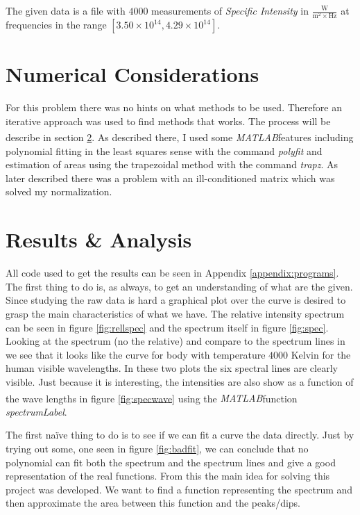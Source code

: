 \documentclass[10pt, a4paper]{article}
\newcommand{\matlab}{\small{\emph{MATLAB\textsuperscript{\textregistered}}}}
\begin{document}
The given data is a file with $4000$ measurements of \emph{Specific Intensity} in $\frac{\mathrm{W}}{\mathrm{m}^2\times \mathrm{Hz}}$ at frequencies in the range $[3.50\times10^{14}, 4.29\times10^{14}]$.

\section{Numerical Considerations}
For this problem there was no hints on what methods to be used. Therefore an iterative approach was used to find methods that works. The process will be describe in section \ref{sec:result}. As described there, I used some \matlab features including polynomial fitting in the least squares sense with the command \emph{polyfit} and estimation of areas using the trapezoidal method with the command \emph{trapz}. As later described there was a problem with an ill-conditioned matrix which was solved my normalization.

\section{Results \& Analysis} \label{sec:result}
All code used to get the results can be seen in Appendix \ref{appendix:programs}. The first thing to do is, as always, to get an understanding of what are the given. Since studying the raw data is hard a graphical plot over the curve is desired to grasp the main characteristics of what we have. The relative intensity spectrum can be seen in figure \ref{fig:rellspec} and the spectrum itself in figure \ref{fig:spec}. Looking at the spectrum (no the relative) and compare to the spectrum lines in \cite{astronotes1} we see that it looks like the curve for body with temperature $4000$ Kelvin for the human visible wavelengths. In these two plots the six spectral lines are clearly visible. Just because it is interesting, the intensities are also show as a function of the wave lengths in figure \ref{fig:specwave} using the \matlab function \emph{spectrumLabel}\cite{spectrumLabel}.

The first na\"{i}ve thing to do is to see if we can fit a curve the data directly. Just by trying out some, one seen in figure \ref{fig:badfit}, we can conclude that no polynomial can fit both the spectrum and the spectrum lines and give a good representation of the real functions. From this the main idea for solving this project was developed. We want to find a function representing the spectrum and then approximate the area between this function and the peaks/dips.
\end{document}

